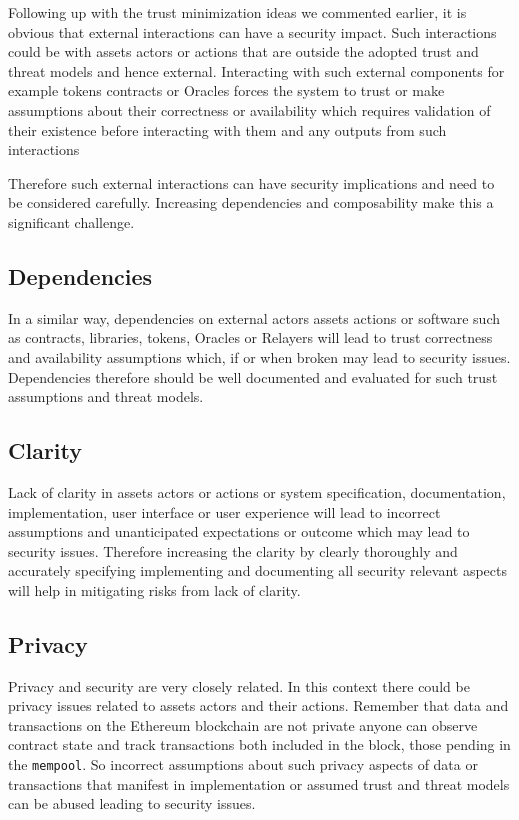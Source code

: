 Following up with the trust minimization ideas we commented earlier, it
is obvious that external interactions can have a security impact. Such
interactions could be with assets actors or actions that are outside the
adopted trust and threat models and hence external. Interacting with
such external components for example tokens contracts or Oracles forces
the system to trust or make assumptions about their correctness or
availability which requires validation of their existence before
interacting with them and any outputs from such interactions

Therefore such external interactions can have security implications and
need to be considered carefully. Increasing dependencies and
composability make this a significant challenge.

\subsection{Dependencies}\label{dependencies}

In a similar way, dependencies on external actors assets actions or
software such as contracts, libraries, tokens, Oracles or Relayers will
lead to trust correctness and availability assumptions which, if or when
broken may lead to security issues. Dependencies therefore should be
well documented and evaluated for such trust assumptions and threat
models.

\subsection{Clarity}\label{clarity}

Lack of clarity in assets actors or actions or system specification,
documentation, implementation, user interface or user experience will
lead to incorrect assumptions and unanticipated expectations or outcome
which may lead to security issues. Therefore increasing the clarity by
clearly thoroughly and accurately specifying implementing and
documenting all security relevant aspects will help in mitigating risks
from lack of clarity.

\subsection{Privacy}\label{privacy}

Privacy and security are very closely related. In this context there
could be privacy issues related to assets actors and their actions.
Remember that data and transactions on the Ethereum blockchain are not
private anyone can observe contract state and track transactions both
included in the block, those pending in the \texttt{mempool}. So
incorrect assumptions about such privacy aspects of data or transactions
that manifest in implementation or assumed trust and threat models can
be abused leading to security issues.


